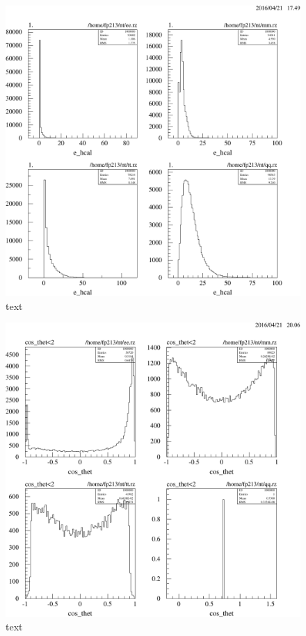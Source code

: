 \documentclass[11pt, a4paper]{article}
\numberwithin{equation}{section}
\begin{document}
\begin{appendix}
\begin{figure}[h]
	\centering
	\includegraphics[width=1\textwidth]{./data/tag2/uncut/cropped/e_hcal_uncut.pdf}
	\caption{text}
\end{figure}

\begin{figure}[h]
	\centering
	\includegraphics[width=1\textwidth]{./data/tag2/angular_mc/cropped/cos_theta.pdf}
	\caption{text}
	\label{fig:cos_theta_uncut}
\end{figure}



\end{appendix}
\end{document}
